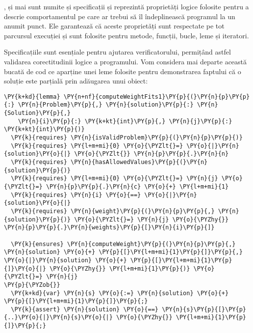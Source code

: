 \begin{sloppypar}
,  și  mai sunt numite și specificații și reprezintă proprietăți logice folosite pentru a descrie comportamentul pe care ar trebui să îl îndeplinească programul la un anumit punct. Ele garantează că aceste proprietăți sunt respectate pe tot parcursul execuției și sunt folosite pentru metode, funcții, bucle, leme și iteratori. \par
Specificațiile sunt esențiale pentru ajutarea verificatorului, permițând astfel validarea corectitudinii logice a programului. Vom considera mai departe această bucată de cod ce aparține unei leme folosite pentru demonstrarea faptului că o soluție este parțială prin adăugarea unui obiect:
\begin{Verbatim}[commandchars=\\\{\}]
\PY{k+kd}{lemma} \PY{n+nf}{computeWeightFits1}\PY{p}{(}\PY{n}{p}\PY{p}{:} \PY{n}{Problem}\PY{p}{,} \PY{n}{solution}\PY{p}{:} \PY{n}{Solution}\PY{p}{,} 
    \PY{n}{i}\PY{p}{:} \PY{k+kt}{int}\PY{p}{,} \PY{n}{j}\PY{p}{:} \PY{k+kt}{int}\PY{p}{)}
  \PY{k}{requires} \PY{n}{isValidProblem}\PY{p}{(}\PY{n}{p}\PY{p}{)}
  \PY{k}{requires} \PY{l+m+mi}{0} \PY{o}{\PYZlt{}=} \PY{o}{|}\PY{n}{solution}\PY{o}{|} \PY{o}{\PYZlt{}} \PY{n}{p}\PY{p}{.}\PY{n}{n}
  \PY{k}{requires} \PY{n}{hasAllowedValues}\PY{p}{(}\PY{n}{solution}\PY{p}{)}
  \PY{k}{requires} \PY{l+m+mi}{0} \PY{o}{\PYZlt{}=} \PY{n}{j} \PY{o}{\PYZlt{}=} \PY{n}{p}\PY{p}{.}\PY{n}{c} \PY{o}{+} \PY{l+m+mi}{1}
  \PY{k}{requires} \PY{n}{i} \PY{o}{==} \PY{o}{|}\PY{n}{solution}\PY{o}{|}
  \PY{k}{requires} \PY{n}{weight}\PY{p}{(}\PY{n}{p}\PY{p}{,} \PY{n}{solution}\PY{p}{)} \PY{o}{\PYZlt{}=} \PY{n}{j} \PY{o}{\PYZhy{}} \PY{n}{p}\PY{p}{.}\PY{n}{weights}\PY{p}{[}\PY{n}{i}\PY{p}{]}
  
  \PY{k}{ensures} \PY{n}{computeWeight}\PY{p}{(}\PY{n}{p}\PY{p}{,} \PY{n}{solution} \PY{o}{+} \PY{p}{[}\PY{l+m+mi}{1}\PY{p}{]}\PY{p}{,} \PY{o}{|}\PY{n}{solution} \PY{o}{+} \PY{p}{[}\PY{l+m+mi}{1}\PY{p}{]}\PY{o}{|} \PY{o}{\PYZhy{}} \PY{l+m+mi}{1}\PY{p}{)} \PY{o}{\PYZlt{}=} \PY{n}{j}
\PY{p}{\PYZob{}}
  \PY{k+kd}{var} \PY{n}{s} \PY{o}{:=} \PY{n}{solution} \PY{o}{+} \PY{p}{[}\PY{l+m+mi}{1}\PY{p}{]}\PY{p}{;}
  \PY{k}{assert} \PY{n}{solution} \PY{o}{==} \PY{n}{s}\PY{p}{[}\PY{p}{..}\PY{o}{|}\PY{n}{s}\PY{o}{|} \PY{o}{\PYZhy{}} \PY{l+m+mi}{1}\PY{p}{]}\PY{p}{;}


\end{Verbatim}
\end{sloppypar}
